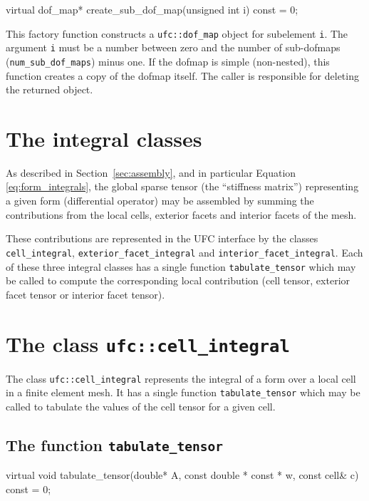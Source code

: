 \begin{code}
virtual dof_map* create_sub_dof_map(unsigned int i) const = 0;
\end{code}

This factory function constructs a \texttt{ufc::dof\_map} object for
subelement \texttt{i}. The argument \texttt{i} must be a number
between zero and the number of sub-dofmaps
(\texttt{num\_sub\_dof\_maps}) minus one. If the dofmap is simple
(non-nested), this function creates a copy of the dofmap itself. The
caller is responsible for deleting the returned object.

\section{The integral classes}

As described in Section~\ref{sec:assembly}, and in particular Equation
\eqref{eq:form_integrals}, the global sparse tensor
(the ``stiffness matrix'') representing a given form (differential
operator) may be assembled by summing the contributions from the local
cells, exterior facets and interior facets of the mesh.

These contributions are represented in the UFC interface by the
classes \texttt{cell\_integral}, \texttt{exterior\_facet\_integral}
and \texttt{interior\_facet\_integral}. Each of these three integral
classes has a single function \texttt{tabulate\_tensor} which may be
called to compute the corresponding local contribution (cell tensor,
exterior facet tensor or interior facet tensor).

\section{The class \texttt{ufc::cell\_integral}}

The class \texttt{ufc::cell\_integral} represents the integral of a
form over a local cell in a finite element mesh. It has a single
function \texttt{tabulate\_tensor} which may be called to tabulate the
values of the cell tensor for a given cell.

\subsection{The function \texttt{tabulate\_tensor}}

\begin{code}
virtual void tabulate_tensor(double* A,
                             const double * const * w,
                             const cell& c) const = 0;
\end{code}

